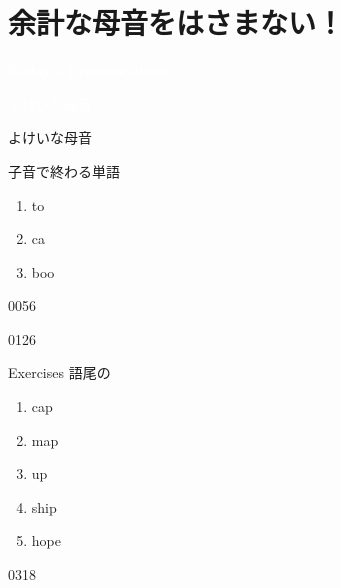 \documentclass[aspectratio=169,xcolor={dvipsnames,table}]{beamer}
\begin{document}
\section{余計な母音をはさまない！}
\begin{frame}
  \centering
  \textcolor{white}{\Huge\bfseries Today's Pronunciation}

  \vspace{30pt}

  \textcolor{white}{\Large よけいな母音}

  \vfill


\end{frame}
\begin{frame}[plain]{よけいな母音}
  \Large

  子音で終わる単語

  \begin{enumerate}

    \item<1-> to\hspace{43pt}%
    \item<1-> ca\hspace{45pt}%
    \item<1-> boo\hspace{33pt}%
  \end{enumerate}

  \hfill{\tiny 0056}\,{\scriptsize {}}

  \hfill{\tiny 0126}\,{\scriptsize {}}\end{frame}
\begin{frame}[plain]{Exercises 語尾の}
  \Large
  \begin{enumerate}
    \item cap
    \item map
    \item up
    \item ship
    \item hope
  \end{enumerate}

  \hfill{\tiny 0318}\,{\scriptsize {}}\end{frame}
\end{document}
